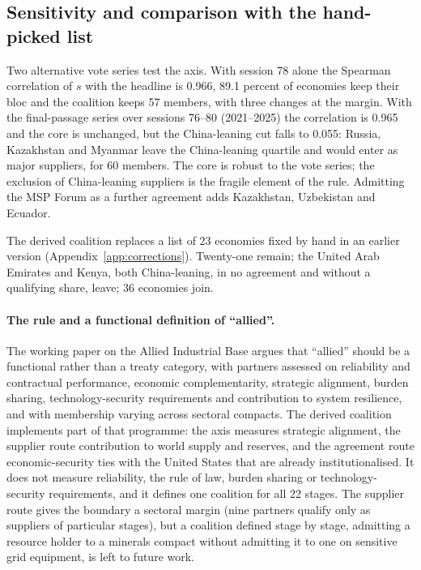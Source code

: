 \subsection{Sensitivity and comparison with the hand-picked list}\label{subsec:coalition_sensitivity}

Two alternative vote series test the axis. With session 78 alone the Spearman correlation of $s$
with the headline is 0.966, 89.1 percent of economies keep their bloc and the coalition keeps 57
members, with three changes at the margin. With the final-passage series over sessions 76--80
(2021--2025) the correlation is 0.965 and the core is unchanged, but the China-leaning cut falls to
0.055: Russia, Kazakhstan and Myanmar leave the China-leaning quartile and would enter as major
suppliers, for 60 members. The core is robust to the vote series; the exclusion of China-leaning
suppliers is the fragile element of the rule. Admitting the MSP Forum as a further agreement adds
Kazakhstan, Uzbekistan and Ecuador.

The derived coalition replaces a list of 23 economies fixed by hand in an earlier version
(Appendix~\ref{app:corrections}). Twenty-one remain; the United Arab Emirates and Kenya, both
China-leaning, in no agreement and without a qualifying share, leave; 36 economies join.

\paragraph{The rule and a functional definition of ``allied''.} The working paper on the Allied
Industrial Base \citep{neis2026allied} argues that ``allied'' should be a functional rather than a
treaty category, with partners assessed on reliability and contractual performance, economic
complementarity, strategic alignment, burden sharing, technology-security requirements and
contribution to system resilience, and with membership varying across sectoral compacts. The derived
coalition implements part of that programme: the axis measures strategic alignment, the supplier
route contribution to world supply and reserves, and the agreement route economic-security ties
with the United States that are already institutionalised. It does not measure reliability, the
rule of law, burden sharing or technology-security requirements, and it defines one coalition for
all 22 stages. The supplier route gives the boundary a sectoral margin (nine partners qualify only
as suppliers of particular stages), but a coalition defined stage by stage, admitting a resource
holder to a minerals compact without admitting it to one on sensitive grid equipment, is left to
future work.
